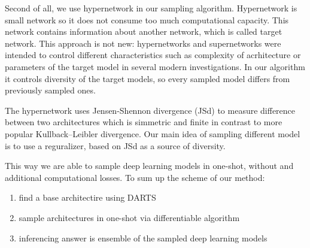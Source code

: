 \documentclass{article}
\begin{document}
Second of all, we use hypernetwork in our sampling algorithm. Hypernetwork is small network so it does not
consume too much computational capacity. This network contains information about another network, which is called target network.
This approach is not new: hypernetworks and supernetworks were intended to control different characteristics such as
complexity of acrhitecture or parameters of the target model in several modern investigations. In our algorithm it controls 
diversity of the target models, so every sampled model differs from previously sampled ones.

The hypernetwork uses Jensen-Shennon divergence (JSd) to measure difference between two architectures which is simmetric and finite
in contrast to more popular Kullback–Leibler divergence. Our main idea of sampling different model is to use a reguralizer,
based on JSd as a source of diversity.

This way we are able to sample deep learning models in one-shot, without and additional computational losses.
To sum up the scheme of our method:
\begin{enumerate} 
    \item find a base architectire using DARTS
    \item sample architectures in one-shot via differentiable algorithm
    \item inferencing answer is ensemble of the sampled deep learning models
\end{enumerate}

\printbibliography
\end{document}
